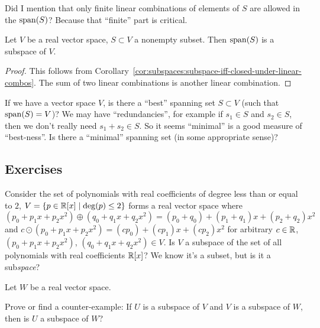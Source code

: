 \begin{remark}
Did I mention that only finite linear combinations of elements of $S$
are allowed in the $\operatorname{span}(S)$? Because that ``finite'' part is critical.
\end{remark}

\begin{proposition}
Let $V$ be a real vector space, $S\subset V$ a nonempty subset.
Then $\operatorname{span}(S)$ is a subspace of $V$.
\end{proposition}

\begin{proof}
This follows from Corollary~\ref{cor:subspaces:subspace-iff-closed-under-linear-combos}.
The sum of two linear combinations is another linear combination.
\end{proof}

If we have a vector space $V$, is there a ``best'' spanning set
$S\subset V$ (such that $\operatorname{span}(S)=V$)? We may have ``redundancies'', for
example if $s_{1}\in S$ and $s_{2}\in S$, then we don't really need
$s_{1}+s_{2}\in S$. So it seems ``minimal'' is a good measure of
``best-ness''. Is there a ``minimal'' spanning set (in some appropriate
sense)?

\subsection*{Exercises}

\begin{exercise}
Consider the set of polynomials with real coefficients
  of degree less than or equal to $2$,
  $V=\{p\in\mathbb{R}[x]\mid\deg(p)\leq2\}$ forms a real vector space
  where $(p_{0}+p_{1}x+p_{2}x^{2})\oplus(q_{0}+q_{1}x+q_{2}x^{2})=(p_{0}+q_{0})+(p_{1}+q_{1})x+(p_{2}+q_{2})x^{2}$
  and $c\odot(p_{0}+p_{1}x+p_{2}x^{2})=(cp_{0})+(cp_{1})x+(cp_{2})x^{2}$
  for arbitrary $c\in\mathbb{R}$,
  $(p_{0}+p_{1}x+p_{2}x^{2})$, $(q_{0}+q_{1}x+q_{2}x^{2})\in V$.
  Is $V$ a subspace of the set of all polynomials with real coefficients $\mathbb{R}[x]$?
  We know it's a subset, but is it a sub\emph{space}?
\end{exercise}

\begin{exercise}
Let $W$ be a real vector space.

Prove or find a counter-example: If $U$ is a subspace of $V$ and $V$ is
a subspace of $W$, then is $U$ a subspace of $W$?
\end{exercise}

